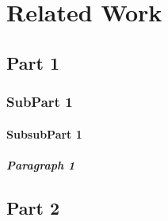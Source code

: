 \cleardoublepage
\chapter{Related Work}


\label{ch:relw}

\section{Part 1}

\subsection{SubPart 1}

\subsubsection{SubsubPart 1}

\paragraph{Paragraph 1} 

\section{Part 2}